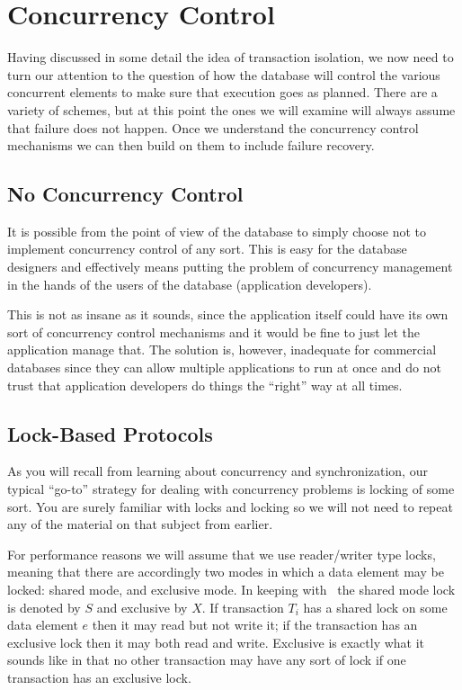 




\section*{Concurrency Control}

Having discussed in some detail the idea of transaction isolation, we now need to turn our attention to the question of how the database will control the various concurrent elements to make sure that execution goes as planned. There are a variety of schemes, but at this point the ones we will examine will always assume that failure does not happen. Once we understand the concurrency control mechanisms we can then build on them to include failure recovery.

\subsection*{No Concurrency Control}

It is possible from the point of view of the database to simply choose not to implement concurrency control of any sort. This is easy for the database designers and effectively means putting the problem of concurrency management in the hands of the users of the database (application developers).

This is not as insane as it sounds, since the application itself could have its own sort of concurrency control mechanisms and it would be fine to just let the application manage that. The solution is, however, inadequate for commercial databases since they can allow multiple applications to run at once and do not trust that application developers do things the ``right'' way at all times.

\subsection*{Lock-Based Protocols}

As you will recall from learning about concurrency and synchronization, our typical ``go-to'' strategy for dealing with concurrency problems is locking of some sort. You are surely familiar with locks and locking so we will not need to repeat any of the material on that subject from earlier.

For performance reasons we will assume that we use reader/writer type locks, meaning that there are accordingly two modes in which a data element may be locked: shared mode, and exclusive mode. In keeping with~\cite{dsc} the shared mode lock is denoted by $S$ and exclusive by $X$. If transaction $T_{i}$ has a shared lock on some data element $e$ then it may read but not write it; if the transaction has an exclusive lock then it may both read and write. Exclusive is exactly what it sounds like in that no other transaction may have any sort of lock if one transaction has an exclusive lock.

